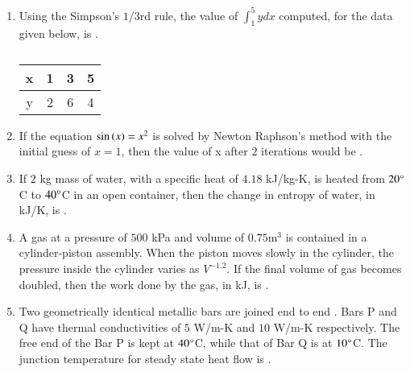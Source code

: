 \documentclass[journal,12pt,onecolumn]{IEEEtran}
\theoremstyle{remark}
\begin{document}
\begin{enumerate}
    \item Using the Simpson's $1/3$rd rule, the value of $\int_1^5 ydx$ computed, for the data given below, is \underline{\hspace{2cm}}.
    
    \begin{table}[H]
        \centering
        \caption*{}
        \label{tab:q27}
        \begin{tabular}{c|ccc}
            \hline
            x & 1 & 3 & 5 \\
            \hline
            y & 2 & 6 & 4 \\
            \hline
        \end{tabular}
    \end{table}
    
    \hfill{}
    
    \item If the equation $\sin\left(x\right) = x^2$ is solved by Newton Raphson's method with the initial guess of $x=1$, then the value of x after $2$ iterations would be \underline{\hspace{2cm}}.
    
    \hfill{}
    
    \item If $2$ kg mass of water, with a specific heat of $4.18$ kJ/kg-K, is heated from $20\degree$C to $40\degree$C in an open container, then the change in entropy of water, in kJ/K, is \underline{\hspace{2cm}}.
    
    \hfill{}
    
    \item A gas at a pressure of $500$ kPa and volume of $0.75\text{m}^3$ is contained in a cylinder-piston assembly. When the piston moves slowly in the cylinder, the pressure inside the cylinder varies as $V^{-1.2}$. If the final volume of gas becomes doubled, then the work done by the gas, in kJ, is \underline{\hspace{2cm}}.
    
    \hfill{}
    
    \item Two geometrically identical metallic bars are joined end to end . Bars P and Q have thermal conductivities of $5$ W/m-K and $10$ W/m-K respectively. The free end of the Bar P is kept at $40\degree$C, while that of Bar Q is at $10\degree$C. The junction temperature  for steady state heat flow is \underline{\hspace{2cm}}.
    

\end{enumerate}
\end{document}
